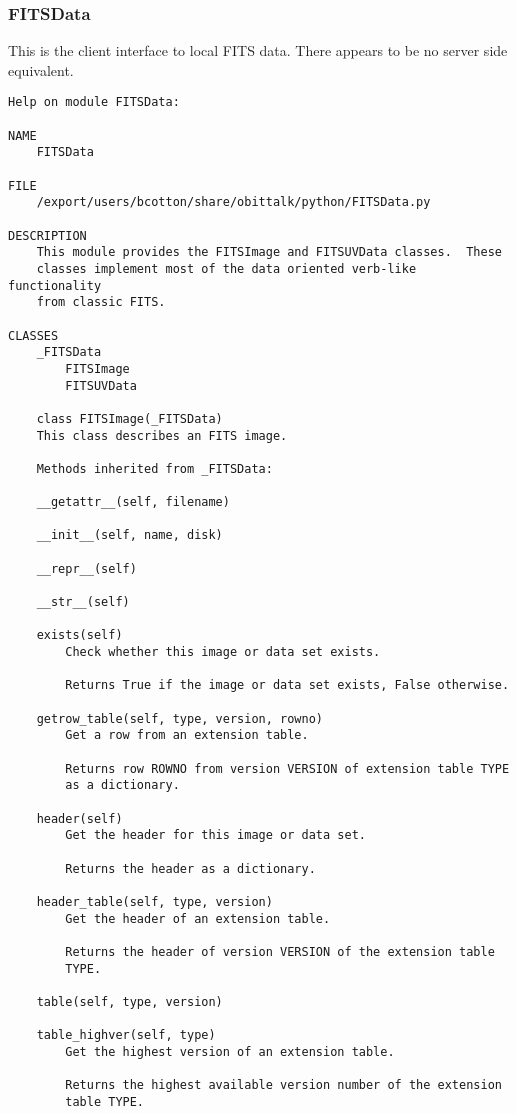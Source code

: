 \documentclass[11pt]{report}
\begin{document}
\subsubsection{FITSData}
This is the client interface to local FITS data.
There appears to be no server side equivalent.
\begin{verbatim}
Help on module FITSData:

NAME
    FITSData

FILE
    /export/users/bcotton/share/obittalk/python/FITSData.py

DESCRIPTION
    This module provides the FITSImage and FITSUVData classes.  These
    classes implement most of the data oriented verb-like functionality
    from classic FITS.

CLASSES
    _FITSData
        FITSImage
        FITSUVData
    
    class FITSImage(_FITSData)
    This class describes an FITS image.
    
    Methods inherited from _FITSData:
    
    __getattr__(self, filename)
    
    __init__(self, name, disk)
    
    __repr__(self)
    
    __str__(self)
    
    exists(self)
        Check whether this image or data set exists.
        
        Returns True if the image or data set exists, False otherwise.
    
    getrow_table(self, type, version, rowno)
        Get a row from an extension table.
        
        Returns row ROWNO from version VERSION of extension table TYPE
        as a dictionary.
    
    header(self)
        Get the header for this image or data set.
        
        Returns the header as a dictionary.
    
    header_table(self, type, version)
        Get the header of an extension table.
        
        Returns the header of version VERSION of the extension table
        TYPE.
    
    table(self, type, version)
    
    table_highver(self, type)
        Get the highest version of an extension table.
        
        Returns the highest available version number of the extension
        table TYPE.
    

\end{verbatim}
\end{document}
